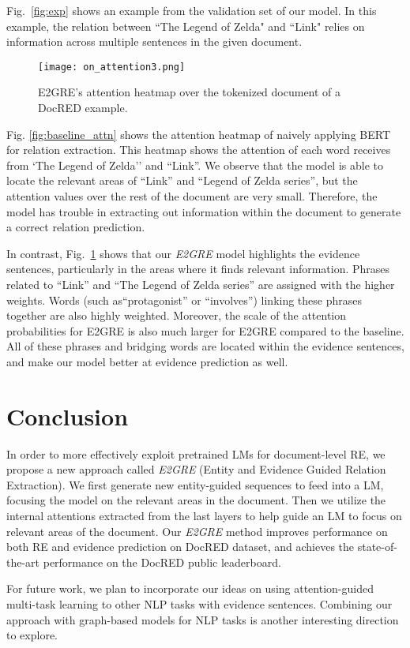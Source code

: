 \documentclass[11pt,a4paper]{article}
\begin{document}
Fig.~\ref{fig:exp} shows an example from the validation set of our model. In this example, the relation between ``The Legend of Zelda" and ``Link" relies on information across multiple sentences in the given document. 

\begin{figure}[t]
    \centering
    \texttt{[image: on\_attention3.png]}
    \caption{E2GRE's attention heatmap over the tokenized document of a DocRED example.}
\label{fig:on_attn}
\end{figure}

Fig. \ref{fig:baseline_attn} shows the attention heatmap of naively applying BERT for relation extraction. 
This heatmap shows the attention of each word receives from `The Legend of Zelda'' and ``Link''.
We observe that the model is able to locate the relevant areas of ``Link'' and ``Legend of Zelda series'', but the attention values over the rest of the document are very small. Therefore, the model has trouble in extracting out information within the document to generate a correct relation prediction. 
 
In contrast, Fig.~\ref{fig:on_attn} shows that our {\em E2GRE} model highlights the evidence sentences, particularly in the areas where it finds relevant information. 
Phrases related to ``Link'' and ``The Legend of Zelda series'' are assigned with the higher weights. Words (such as``protagonist'' or ``involves'') linking these phrases together are also highly weighted. Moreover, the scale of the attention probabilities for E2GRE is also much larger for E2GRE compared to the baseline.
All of these phrases and bridging words are located within the evidence sentences, and make our model better at evidence prediction as well.



\section{Conclusion}
In order to more effectively exploit pretrained LMs for document-level RE, we propose a new approach called {\em E2GRE} (Entity and Evidence Guided Relation Extraction). We first generate new entity-guided sequences to feed into a LM, focusing the model on the relevant areas in the document. Then we utilize the internal attentions extracted from the last  layers to help guide an LM to focus on relevant areas of the document. Our {\em E2GRE} method improves performance on both RE and evidence prediction on DocRED dataset, and achieves the state-of-the-art performance on the DocRED public leaderboard.


For future work, we plan to incorporate our ideas on using attention-guided multi-task learning to other NLP tasks with evidence sentences. Combining our approach with graph-based models for NLP tasks is another interesting direction to explore.


                     

\end{document}
